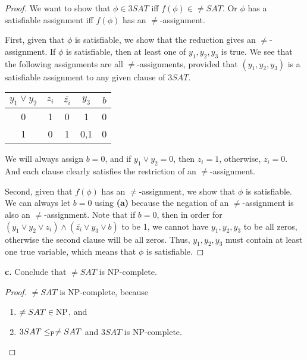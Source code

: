 \begin{mdframed}
\begin{proof}
We want to show that $\phi \in 3SAT$ iff $f(\phi) \in \neq SAT$. Or $\phi$ has a satisfiable assignment iff $f(\phi)$ has an $\neq$-assignment.

\medskip
First, given that $\phi$ is satisfiable, we show that the reduction gives an $\neq$-assignment. If $\phi$ is satisfiable, then at least one of $y_1, y_2, y_3$ is true. We see that the following assignments are all $\neq$-assignments, provided that $(y_1, y_2, y_3)$ is a satisfiable assignment to any given clause of $3SAT$.
\begin{center}
\begin{tabular}{|c|c||c|c|c|}
\hline
$y_1 \vee y_2$  & $z_i$ &  $\overline{z_i}$  & $y_3$ & $b$  \\ \hline \hline
0 & 1 & 0 & 1 & 0 \\ \hline
1 & 0 & 1 & 0,1& 0 \\ \hline
\end{tabular}
\end{center}

We will always assign $b=0$, and if $y_1 \vee y_2 = 0$, then $z_i = 1$, otherwise, $z_i = 0$. And each clause clearly satisfies the restriction of an $\neq$-assignment.

\medskip
Second, given that $f(\phi)$ has an $\neq$-assignment, we show that $\phi$ is satisfiable. We can always let $b=0$ using \textbf{(a)} because the negation of an $\neq$-assignment is also an $\neq$-assignment. Note that if $b=0$, then in order for$(y_1 \vee y_2 \vee z_i) \wedge (\overline{z_i} \vee y_3 \vee b)$ to be 1, we cannot have $y_1, y_2, y_3$ to be all zeros, otherwise the second clause will be all zeros. Thus, $y_1, y_2, y_3$ must contain at least one true variable, which means that $\phi$ is satisfiable. 
\end{proof}
\end{mdframed}

\textbf{c.} Conclude that $\neq SAT$ is NP-complete.
\begin{mdframed}
\begin{proof}
$\neq SAT$ is NP-complete, because 
\begin{enumerate}
\item $\neq SAT \in \NP$, and
\item $3SAT \leq_\P \neq SAT$ and $3SAT$ is NP-complete.
\end{enumerate}
\end{proof}
\end{mdframed}

